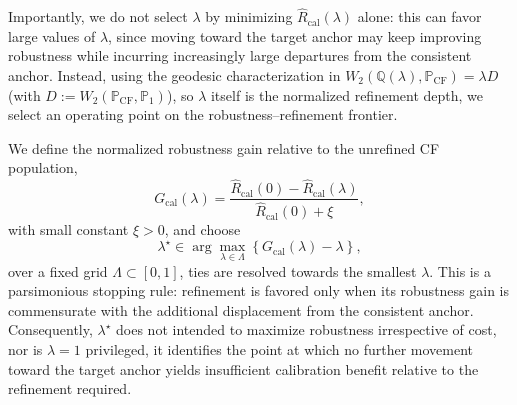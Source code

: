 \iffalse
Importantly, we do not select $\lambda$ by minimizing $\widehat{R}_{\mathrm{cal}}(\lambda)$ alone:
this can favor large values of $\lambda$, since moving toward the target anchor may keep improving robustness while incurring increasingly large departures from the \textcolor{frappe_red}{consistent} anchor. 
Instead, using the geodesic characterization in $W_2\!\left(
\mathbb{Q}(\lambda),
\mathbb{P}_{\mathrm{CF}}
\right)
=
\lambda D$ (with $D
:=
W_2(\mathbb{P}_{\mathrm{CF}},\mathbb{P}_1)$), 
so $\lambda$ itself is the normalized refinement depth, we select an operating point on the
robustness--refinement frontier.

We define the normalized robustness gain relative to the unrefined CF population,
\begin{equation}
 G_{\mathrm{cal}}(\lambda)
 =
 \frac{
 \widehat{R}_{\mathrm{cal}}(0)
 -
 \widehat{R}_{\mathrm{cal}}(\lambda)
 }{
 \widehat{R}_{\mathrm{cal}}(0)+\xi
 },
 \label{eq:calibration_gain}
 \end{equation}
 with small constant $\xi>0$, and choose
 \begin{equation}
 \lambda^\star
 \in
 \arg\max_{\lambda\in\Lambda}
 \left\{
 G_{\mathrm{cal}}(\lambda)-\lambda
 \right\},
 \label{eq:lambda_calibration}
 \end{equation}
 over a fixed grid $\Lambda\subset[0,1]$, ties are resolved towards the smallest $\lambda$.
This is a parsimonious stopping rule:
refinement is favored only when its robustness gain is commensurate with the additional displacement from the \textcolor{frappe_red}{consistent} anchor.
Consequently, $\lambda^\star$ does not intended to maximize robustness irrespective of cost, nor is $\lambda=1$ privileged, it identifies the point at which no further movement toward the target anchor yields insufficient calibration benefit relative to the refinement required. 

